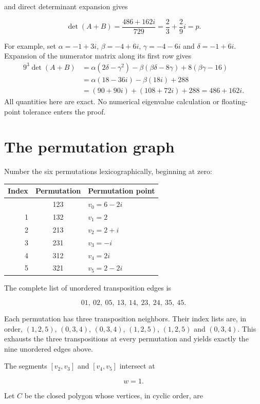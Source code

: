 \documentclass[11pt]{article}
\begin{document}
and direct determinant expansion gives

\[
\det(A+B)=\frac{486+162i}{729}=\frac23+\frac29 i=p.
\]

For example, set $\alpha=-1+3i$, $\beta=-4+6i$, $\gamma=-4-6i$ and $\delta=-1+6i$. Expansion of the numerator matrix along its first row gives
\begin{align*}
 9^3\det(A+B)&=\alpha(2\delta-\gamma^2)-\beta(\beta\delta-8\gamma)+8(\beta\gamma-16)\\
 &=\alpha(18-36i)-\beta(18i)+288\\
 &=(90+90i)+(108+72i)+288=486+162i.
\end{align*}
All quantities here are exact. No numerical eigenvalue calculation or floating-point tolerance enters the proof.

\section{The permutation graph}\label{the-permutation-graph}

Number the six permutations lexicographically, beginning at zero:

\begin{longtable}[]{@{}rcl@{}}
\toprule\noalign{}
Index & Permutation & Permutation point \\
\midrule\noalign{}
\endhead
\bottomrule\noalign{}
\endlastfoot
0 & 123 & \(v_0=6-2i\) \\
1 & 132 & \(v_1=2\) \\
2 & 213 & \(v_2=2+i\) \\
3 & 231 & \(v_3=-i\) \\
4 & 312 & \(v_4=2i\) \\
5 & 321 & \(v_5=2-2i\) \\
\end{longtable}

The complete list of unordered transposition edges is

\[
01,\ 02,\ 05,\ 13,\ 14,\ 23,\ 24,\ 35,\ 45.
\]

Each permutation has three transposition neighbors. Their index lists are, in order, $(1,2,5)$, $(0,3,4)$, $(0,3,4)$, $(1,2,5)$, $(1,2,5)$ and $(0,3,4)$. This exhausts the three transpositions at every permutation and yields exactly the nine unordered edges above.

The segments \([v_2,v_3]\) and \([v_4,v_5]\) intersect at

\[
w=1.
\]

Let \(C\) be the closed polygon whose vertices, in cyclic order, are
\end{document}
